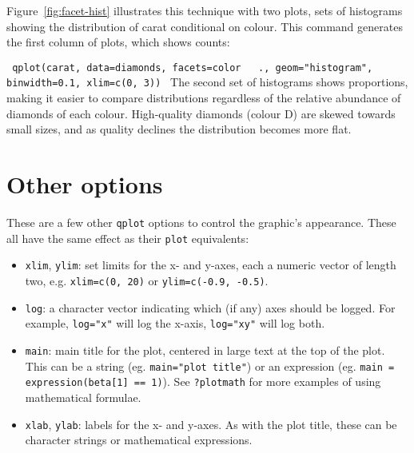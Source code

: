 
Figure~\ref{fig:facet-hist} illustrates this technique with two plots, sets of histograms showing the distribution of carat conditional on colour. This command generates the first column of plots, which shows counts:

{\tt
 qplot(carat, data=diamonds, facets=color ~ ., geom="histogram", binwidth=0.1, xlim=c(0, 3))
}
%
The second set of histograms shows proportions, making it easier to compare distributions regardless of the relative abundance of diamonds of each colour. High-quality diamonds (colour D) are skewed towards small sizes, and as quality declines the distribution becomes more flat.  


% 


\section{Other options}\label{sec:other_options}

These are a few other {\tt qplot} options to control the graphic's appearance. These all have the same effect as their {\tt plot} equivalents:

\begin{itemize}
  \item {\tt xlim}, {\tt ylim}: set limits for the x- and y-axes, each a numeric vector of length two, e.g. {\tt xlim=c(0, 20)} or {\tt ylim=c(-0.9, -0.5)}.
  \item {\tt log}: a character vector indicating which (if any) axes should be logged.  For example, {\tt log="x"} will log the x-axis, {\tt log="xy"} will log both.
  \item {\tt main}: main title for the plot, centered in large text at the top of the plot.  This can be a string (eg. {\tt main="plot title"}) or an expression (eg. {\tt main = expression(beta[1] == 1)}).  See {\tt ?plotmath} for more examples of using mathematical formulae.
  \item {\tt xlab}, {\tt ylab}: labels for the x- and y-axes.  As with the plot title, these can be character strings or mathematical expressions.
\end{itemize}

